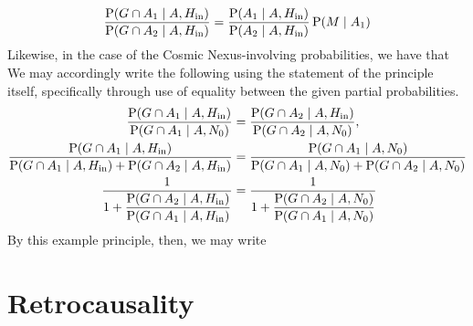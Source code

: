 \begin{equation}
    \dfrac{\operatorname{P} \! \left( G \cap A_1 \;\middle|\; A, H_{\textnormal{in}} \right)}{\operatorname{P} \! \left( G \cap A_2 \;\middle|\; A, H_{\textnormal{in}} \right)} = \dfrac{\operatorname{P} \! \left( A_1 \;\middle|\; A, H_{\textnormal{in}} \right)}{\operatorname{P} \! \left( A_2 \;\middle|\; A, H_{\textnormal{in}} \right)} \operatorname{P} \! \left( M \;\middle|\; A_1 \right)
\end{equation}
Likewise, in the case of the Cosmic Nexus-involving probabilities, we have that 
We may accordingly write the following using the statement of the principle itself, specifically through use of equality between the given partial probabilities. 
\begin{equation}
    \begin{aligned}
        \dfrac{\operatorname{P} \! \left( G \cap A_1 \;\middle|\; A, H_{\textnormal{in}} \right)}{\operatorname{P} \! \left( G \cap A_1 \;\middle|\; A, N_0 \right)} & = \dfrac{\operatorname{P} \! \left( G \cap A_2 \;\middle|\; A, H_{\textnormal{in}} \right)}{\operatorname{P} \! \left( G \cap A_2 \;\middle|\; A, N_0 \right)}, \\
        \dfrac{\operatorname{P} \! \left( G \cap A_1 \;\middle|\; A, H_{\textnormal{in}} \right)}{\operatorname{P} \! \left( G \cap A_1 \;\middle|\; A, H_{\textnormal{in}} \right) + \operatorname{P} \! \left( G \cap A_2 \;\middle|\; A, H_{\textnormal{in}} \right)} & = \dfrac{\operatorname{P} \! \left( G \cap A_1 \;\middle|\; A, N_0 \right)}{\operatorname{P} \! \left( G \cap A_1 \;\middle|\; A, N_0 \right) + \operatorname{P} \! \left( G \cap A_2 \;\middle|\; A, N_0 \right)} \\
        \dfrac{1}{1 + \dfrac{\operatorname{P} \! \left( G \cap A_2 \;\middle|\; A, H_{\textnormal{in}} \right)}{\operatorname{P} \! \left( G \cap A_1 \;\middle|\; A, H_{\textnormal{in}} \right)}} & = \dfrac{1}{1 + \dfrac{\operatorname{P} \! \left( G \cap A_2 \;\middle|\; A, N_0 \right)}{\operatorname{P} \! \left( G \cap A_1 \;\middle|\; A, N_0 \right)}} \\
        
    \end{aligned}
\end{equation}
By this example principle, then, we may write 

\section{Retrocausality}

